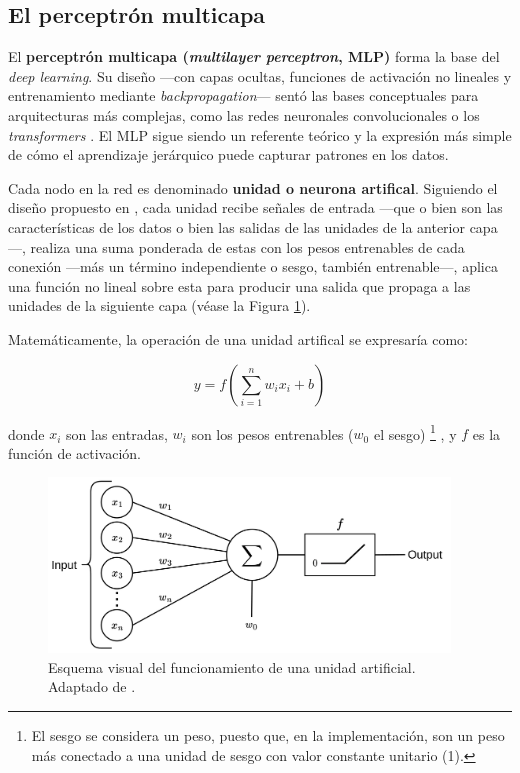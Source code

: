 \subsection{El perceptrón multicapa}

El \textbf{perceptrón multicapa (\textit{multilayer perceptron}, MLP)} forma la base del \textit{deep 
learning}. Su diseño ---con capas ocultas, funciones de activación no lineales y entrenamiento  mediante 
\textit{backpropagation}--- sentó las bases conceptuales para arquitecturas más complejas, como las redes 
neuronales convolucionales o los \textit{transformers} \cite{murphy2022}. El MLP sigue siendo un referente 
teórico y la expresión más simple de cómo el aprendizaje jerárquico puede capturar patrones en los datos. 

Cada nodo en la red es denominado \textbf{unidad o neurona artifical}. Siguiendo el diseño propuesto en 
\cite{mcculloch1943,rosenblatt1958}, cada unidad recibe señales de entrada ---que o bien son las 
características de los datos o bien las salidas de las unidades de la anterior capa---, realiza una suma 
ponderada de estas con los pesos entrenables de cada conexión ---más un término independiente o sesgo, también 
entrenable---, aplica una función no lineal sobre esta para producir una salida que propaga a las unidades de 
la siguiente capa (véase la Figura \ref{fig:neuron_MLP}).

Matemáticamente, la operación de una unidad artifical se expresaría como:

$$
y = f \left( \sum_{i=1}^n{w_ix_i+b} \right)
$$

donde $x_i$ son las entradas, $w_i$ son los pesos entrenables ($w_0$ el sesgo)%
\footnote{
    El sesgo se considera un peso, puesto que, en la implementación, son un peso más conectado a una unidad
    de sesgo con valor constante unitario (1).
}
, y $f$ es la función de activación.

\begin{figure}[h]
    \centering
    \includegraphics[width=0.95\textwidth]{capitulos/cap_02/imagenes/Neuron_perceptron.png}
    \caption{
        Esquema visual del funcionamiento de una unidad artificial. Adaptado de 
        \cite{codeworld2022understandingMLDL}.
    } 
    \label{fig:neuron_MLP}
\end{figure}


